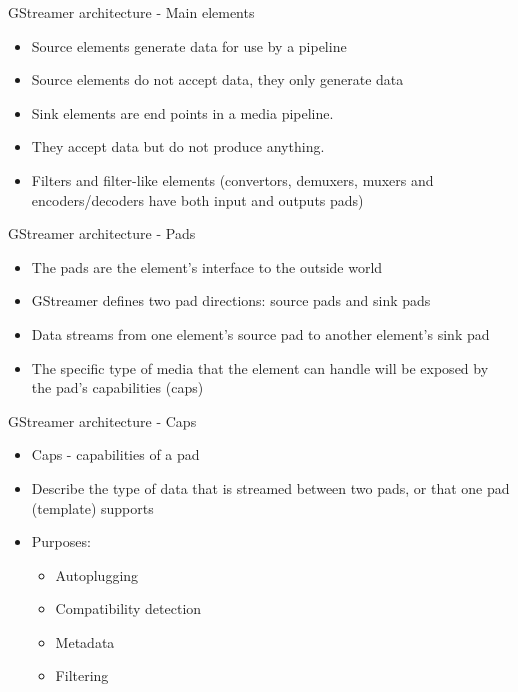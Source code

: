 \documentclass{beamer}
\begin{document}
\begin{frame}{GStreamer architecture - Main elements}
\begin{itemize}
  \item Source elements generate data for use by a pipeline
  \item Source elements do not accept data, they only generate data
  \item Sink elements are end points in a media pipeline.
  \item They accept data but do not produce anything.
  \item Filters and filter-like elements (convertors, demuxers, muxers and encoders/decoders have both input and outputs pads)
\end{itemize}
\end{frame}

\begin{frame}{GStreamer architecture - Pads}
\begin{itemize}
  \item The pads are the element's interface to the outside world
  \item GStreamer defines two pad directions: source pads and sink pads
  \item Data streams from one element's source pad to another element's sink pad
  \item The specific type of media that the element can handle will be exposed by the pad's capabilities (caps)
\end{itemize}
\end{frame}

\begin{frame}{GStreamer architecture - Caps}
\begin{itemize}
  \item Caps - capabilities of a pad
  \item Describe the type of data that is streamed between two pads, or that one pad (template) supports
  \item Purposes:
    \begin{itemize}
      \item Autoplugging
      \item Compatibility detection
      \item Metadata
      \item Filtering
    \end{itemize}
\end{itemize}
\end{frame}
\end{document}
